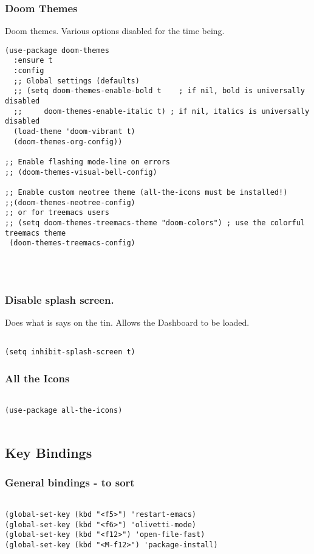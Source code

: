 \documentclass[11pt]{article}
\begin{document}
\subsubsection{Doom Themes}
\label{sec:org0805852}
Doom themes.  Various options disabled for the time being.
\begin{verbatim}
(use-package doom-themes
  :ensure t  
  :config
  ;; Global settings (defaults)
  ;; (setq doom-themes-enable-bold t    ; if nil, bold is universally disabled
  ;;     doom-themes-enable-italic t) ; if nil, italics is universally disabled
  (load-theme 'doom-vibrant t)
  (doom-themes-org-config))

;; Enable flashing mode-line on errors
;; (doom-themes-visual-bell-config)

;; Enable custom neotree theme (all-the-icons must be installed!)
;;(doom-themes-neotree-config)
;; or for treemacs users
;; (setq doom-themes-treemacs-theme "doom-colors") ; use the colorful treemacs theme
 (doom-themes-treemacs-config)




\end{verbatim}
\subsubsection{Disable splash screen.}
\label{sec:org022d1e6}
Does what is says on the tin.  Allows the Dashboard to be loaded. 
\begin{verbatim}

(setq inhibit-splash-screen t)

\end{verbatim}
\subsubsection{All the Icons}
\label{sec:org1018201}

\begin{verbatim}

(use-package all-the-icons)


\end{verbatim}
\subsection{Key Bindings}
\label{sec:org49086b2}
\subsubsection{General bindings - to sort}
\label{sec:orgc8bd5fd}
\begin{verbatim}

(global-set-key (kbd "<f5>") 'restart-emacs)
(global-set-key (kbd "<f6>") 'olivetti-mode)
(global-set-key (kbd "<f12>") 'open-file-fast)
(global-set-key (kbd "<M-f12>") 'package-install)

\end{verbatim}
\end{document}
